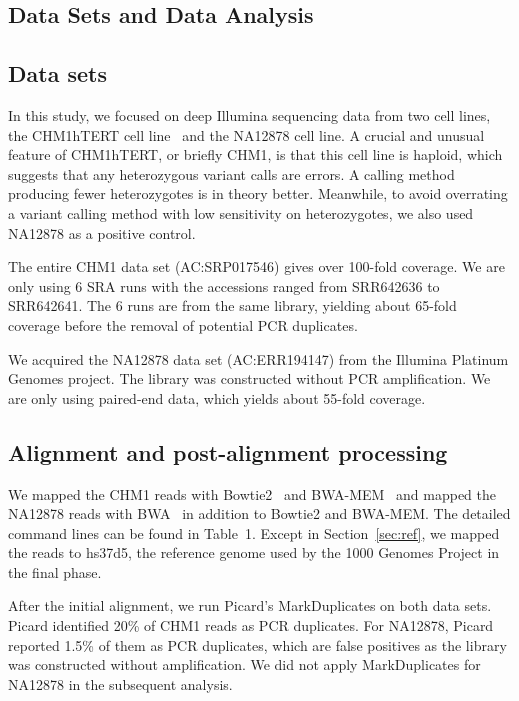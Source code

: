 \documentclass{bioinfo}
\begin{document}
\begin{methods}
\section{Data Sets and Data Analysis}

\subsection{Data sets}

In this study, we focused on deep Illumina sequencing data from two cell lines,
the CHM1hTERT cell line~\citep{Jacobs:1980aa} and the NA12878 cell line. A
crucial and unusual feature of CHM1hTERT, or briefly CHM1, is that this cell
line is haploid, which suggests that any heterozygous variant calls are errors.
A calling method producing fewer heterozygotes is in theory better. Meanwhile,
to avoid overrating a variant calling method with low sensitivity on
heterozygotes, we also used NA12878 as a positive control.

The entire CHM1 data set (AC:SRP017546) gives over 100-fold coverage. We are
only using 6 SRA runs with the accessions ranged from SRR642636 to SRR642641.
The 6 runs are from the same library, yielding about 65-fold coverage before
the removal of potential PCR duplicates.

We acquired the NA12878 data set (AC:ERR194147) from the Illumina Platinum
Genomes project. The library was constructed without PCR amplification. We are
only using paired-end data, which yields about 55-fold coverage.

\subsection{Alignment and post-alignment processing}

We mapped the CHM1 reads with Bowtie2~\citep{Langmead:2012fk} and
BWA-MEM~\citep{Li:2013aa} and mapped the NA12878 reads with
BWA~\citep{Li:2009uq} in addition to Bowtie2 and BWA-MEM. The detailed command
lines can be found in Table~1. Except in Section~\ref{sec:ref}, we mapped the
reads to hs37d5, the reference genome used by the 1000 Genomes Project in the
final phase.

After the initial alignment, we run Picard's MarkDuplicates on both data sets.
Picard identified 20\% of CHM1 reads as PCR duplicates. For NA12878,
Picard reported 1.5\% of them as PCR duplicates, which are false positives as
the library was constructed without amplification. We did not apply
MarkDuplicates for NA12878 in the subsequent analysis.


\end{methods}
\end{document}

